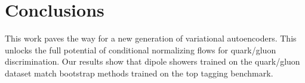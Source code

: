 \section{Conclusions}\label{sec:conclusions}

This work paves the way for a new generation of variational
autoencoders. This unlocks the full potential of conditional normalizing
flows for quark/gluon discrimination. Our results show that dipole
showers trained on the quark/gluon dataset match bootstrap methods
trained on the top tagging benchmark.

